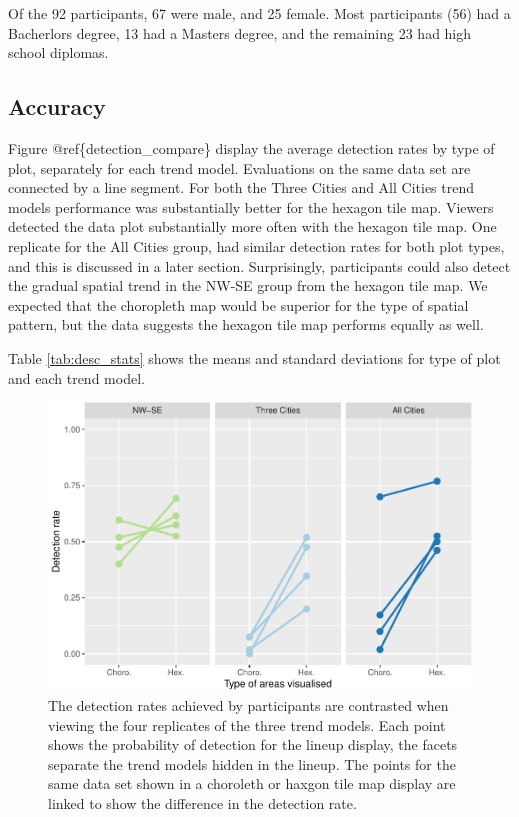 \documentclass[conference,final,]{IEEEtran}
\makeatletter
\def\maxwidth{\ifdim\Gin@nat@width>\linewidth\linewidth
\else\Gin@nat@width\fi}
\let\Oldincludegraphics\includegraphics
\renewcommand{\includegraphics}[1]{\Oldincludegraphics[width=\maxwidth]{#1}}
\makeatother
\begin{document}
Of the 92 participants, 67 were male, and 25 female. Most participants
(56) had a Bacherlors degree, 13 had a Masters degree, and the remaining
23 had high school diplomas.

\hypertarget{accuracy}{%
\subsection{Accuracy}\label{accuracy}}

Figure @ref\{detection\_compare\} display the average detection rates by
type of plot, separately for each trend model. Evaluations on the same
data set are connected by a line segment. For both the Three Cities and
All Cities trend models performance was substantially better for the
hexagon tile map. Viewers detected the data plot substantially more
often with the hexagon tile map. One replicate for the All Cities group,
had similar detection rates for both plot types, and this is discussed
in a later section. Surprisingly, participants could also detect the
gradual spatial trend in the NW-SE group from the hexagon tile map. We
expected that the choropleth map would be superior for the type of
spatial pattern, but the data suggests the hexagon tile map performs
equally as well.

Table \ref{tab:desc_stats} shows the means and standard deviations for
type of plot and each trend model.

\begin{figure}
\centering
\includegraphics{paper_files/figure-latex/detection_compare-1.pdf}
\caption{The detection rates achieved by participants are contrasted
when viewing the four replicates of the three trend models. Each point
shows the probability of detection for the lineup display, the facets
separate the trend models hidden in the lineup. The points for the same
data set shown in a choroleth or haxgon tile map display are linked to
show the difference in the detection rate.}
\end{figure}
\end{document}
